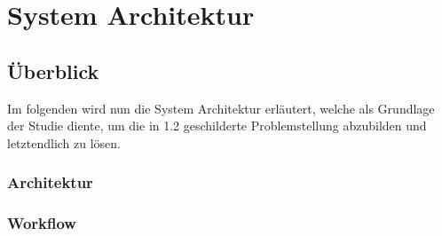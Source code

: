 \chapter{System Architektur}
\label{kap:Kapitel03}

\section{Überblick}

Im folgenden wird nun die System Architektur erläutert, welche als Grundlage der Studie diente, um die in 1.2 geschilderte Problemstellung abzubilden und letztendlich zu lösen. 

\subsection{Architektur}
\subsection{Workflow}
